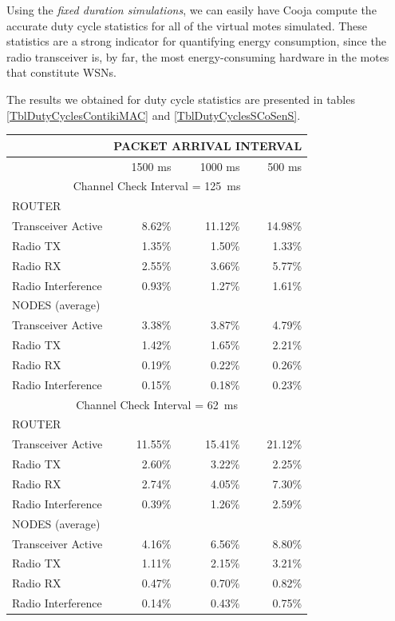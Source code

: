 \documentclass[conference]{IEEEtran}
\begin{document}
Using the \emph{fixed duration simulations}, we can easily have Cooja compute
the accurate duty cycle statistics for all of the virtual motes simulated.
These statistics are a strong indicator for quantifying energy consumption,
since the radio transceiver is, by far, the most energy-consuming hardware
in the motes that constitute WSNs.

The results we obtained for duty cycle statistics are presented in tables
\ref{TblDutyCyclesContikiMAC} and \ref{TblDutyCyclesSCoSenS}.

\begin{table}
\centering
\begin{tabular}{|l|r|r|r|}
\hline
 & \multicolumn{3}{|c|}{PACKET ARRIVAL INTERVAL}\\
\hline
 & 1500 ms & 1000 ms & 500 ms \\
\hline

\multicolumn{4}{|c|}{Channel Check Interval = 125~ms}\\
\hline
 ROUTER & \multicolumn{3}{|c|}{ }\\
\hline
Transceiver Active & 8.62\% & 11.12\% & 14.98\% \\
Radio TX           & 1.35\% &  1.50\% &  1.33\% \\
Radio RX           & 2.55\% &  3.66\% &  5.77\% \\
Radio Interference & 0.93\% &  1.27\% &  1.61\% \\
\hline
 NODES (average) & \multicolumn{3}{|c|}{ }\\
\hline
Transceiver Active & 3.38\% & 3.87\% & 4.79\% \\
Radio TX           & 1.42\% & 1.65\% & 2.21\% \\
Radio RX           & 0.19\% & 0.22\% & 0.26\% \\
Radio Interference & 0.15\% & 0.18\% & 0.23\% \\
\hline

\multicolumn{4}{|c|}{Channel Check Interval = 62~ms}\\
\hline
 ROUTER & \multicolumn{3}{|c|}{ }\\
\hline
Transceiver Active & 11.55\% & 15.41\% & 21.12\% \\
Radio TX           &  2.60\% &  3.22\% &  2.25\% \\
Radio RX           &  2.74\% &  4.05\% &  7.30\% \\
Radio Interference &  0.39\% &  1.26\% &  2.59\% \\
\hline
 NODES (average) & \multicolumn{3}{|c|}{ }\\
\hline
Transceiver Active & 4.16\% & 6.56\% & 8.80\% \\
Radio TX           & 1.11\% & 2.15\% & 3.21\% \\
Radio RX           & 0.47\% & 0.70\% & 0.82\% \\
Radio Interference & 0.14\% & 0.43\% & 0.75\% \\
\hline


\end{tabular}
\end{table}
\end{document}
